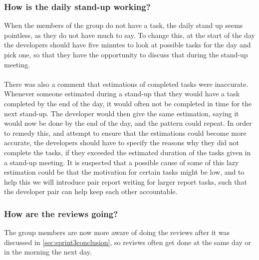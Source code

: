 \subsubsection*{How is the daily stand-up working?}
When the members of the group do not have a task, the daily stand up seems pointless, as they do not have much to say.
To change this, at the start of the day the developers should have five minutes to look at possible tasks for the day and pick one, so that they have the opportunity to discuss that during the stand-up meeting.
\\\\
There was also a comment that estimations of completed tasks were inaccurate.
Whenever someone estimated during a stand-up that they would have a task completed by the end of the day, it would often not be completed in time for the next stand-up.
The developer would then give the same estimation, saying it would now be done by the end of the day, and the pattern could repeat.
In order to remedy this, and attempt to ensure that the estimations could become more accurate, the developers should have to specify the reasons why they did not complete the tasks, if they exceeded the estimated duration of the tasks given in a stand-up meeting.
It is suspected that a possible cause of some of this lazy estimation could be that the motivation for certain tasks might be low, and to help this we will introduce pair report writing for larger report tasks, such that the developer pair can help keep each other accountable.

\subsubsection*{How are the reviews going?}
The group members are now more aware of doing the reviews after it was discussed in \autoref{sec:sprint3conclusion}, so reviews often get done at the same day or in the morning the next day.

